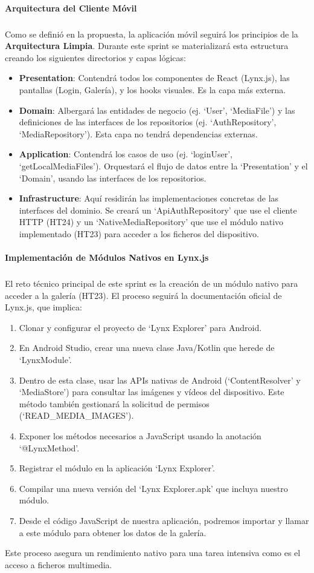 \paragraph{Arquitectura del Cliente Móvil}
\subparagraph{}
Como se definió en la propuesta, la aplicación móvil seguirá los principios de la \textbf{Arquitectura Limpia}. Durante este sprint se materializará esta estructura creando los siguientes directorios y capas lógicas:
\begin{itemize}
    \item \textbf{Presentation}: Contendrá todos los componentes de React (Lynx.js), las pantallas (Login, Galería), y los hooks visuales. Es la capa más externa.
    \item \textbf{Domain}: Albergará las entidades de negocio (ej. `User', `MediaFile') y las definiciones de las interfaces de los repositorios (ej. `AuthRepository', `MediaRepository'). Esta capa no tendrá dependencias externas.
    \item \textbf{Application}: Contendrá los casos de uso (ej. `loginUser', `getLocalMediaFiles'). Orquestará el flujo de datos entre la `Presentation' y el `Domain', usando las interfaces de los repositorios.
    \item \textbf{Infrastructure}: Aquí residirán las implementaciones concretas de las interfaces del dominio. Se creará un `ApiAuthRepository' que use el cliente HTTP (HT24) y un `NativeMediaRepository' que use el módulo nativo implementado (HT23) para acceder a los ficheros del dispositivo.
\end{itemize}

\paragraph{Implementación de Módulos Nativos en Lynx.js}
\subparagraph{}
El reto técnico principal de este sprint es la creación de un módulo nativo para acceder a la galería (HT23). El proceso seguirá la documentación oficial de Lynx.js, que implica:
\begin{enumerate}
    \item Clonar y configurar el proyecto de `Lynx Explorer' para Android.
    \item En Android Studio, crear una nueva clase Java/Kotlin que herede de `LynxModule'.
    \item Dentro de esta clase, usar las APIs nativas de Android (`ContentResolver' y `MediaStore') para consultar las imágenes y vídeos del dispositivo. Este método también gestionará la solicitud de permisos (`READ\_MEDIA\_IMAGES').
    \item Exponer los métodos necesarios a JavaScript usando la anotación `@LynxMethod'.
    \item Registrar el módulo en la aplicación `Lynx Explorer'.
    \item Compilar una nueva versión del `Lynx Explorer.apk' que incluya nuestro módulo.
    \item Desde el código JavaScript de nuestra aplicación, podremos importar y llamar a este módulo para obtener los datos de la galería.
\end{enumerate}
Este proceso asegura un rendimiento nativo para una tarea intensiva como es el acceso a ficheros multimedia.

